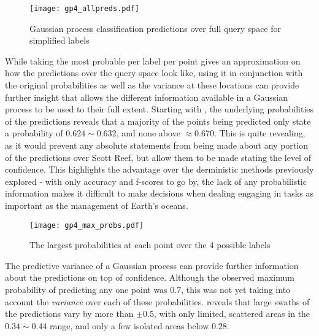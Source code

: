 \begin{figure}
    \texttt{[image: gp4\_allpreds.pdf]}
    \caption{Gaussian process classification predictions over full query space for simplified labels}
    \label{gp4_allpreds}
\end{figure}


While taking the most probable per label per point gives an approximation on how the predictions over the query space look like, using it in conjunction with the original probabilities as well as the variance at these locations can provide further insight that allows the different information available in a Gaussian process to be used to their full extent. Starting with , the underlying probabilities of the predictions reveals that a majority of the points being predicted only state a probability of $0.624 \sim 0.632$, and none above $\approx 0.670$. This is quite revealing, as it would prevent any absolute statements from being made about any portion of the predictions over Scott Reef, but allow them to be made stating the level of confidence. This highlights the advantage over the derministic methods previously explored - with only accuracy and f-scores to go by, the lack of any probabilistic information makes it difficult to make decisions when dealing engaging in tasks as important as the management of Earth's oceans.

\begin{figure}
    \centerline{\texttt{[image: gp4\_max\_probs.pdf]}}
    \caption{The largest probabilities at each point over the $4$ possible labels}
    \label{fig:gp4_probs}
\end{figure}

The predictive variance of a Gaussian process can provide further information about the predictions on top of confidence. Although the observed maximum probability of predicting any one point was $0.7$, this was not yet taking into account the \textit{variance} over each of these probabilities.  reveals that large swaths of the predictions vary by more than $\pm 0.5$, with only limited, scattered areas in the $0.34 \sim 0.44$ range, and only a few isolated areas below $0.28$. 

